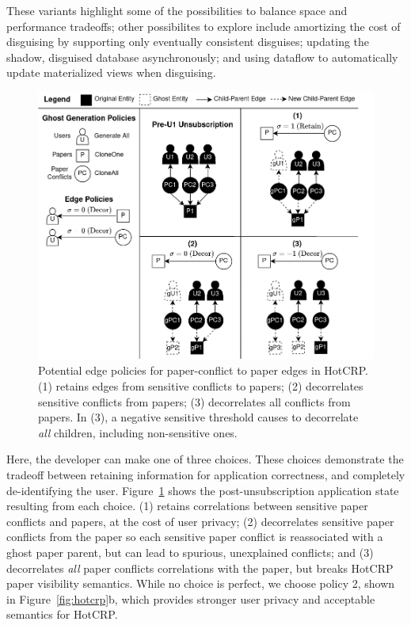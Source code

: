These variants highlight some of the possibilities to balance space and performance tradeoffs; other
possibilites to explore include amortizing the cost of disguising by supporting \eg only eventually
consistent disguises; updating the shadow, disguised database asynchronously; and using dataflow
to automatically update materialized views when disguising.

\iffalse
\begin{figure}[t!]
    \centering
    \includegraphics[width=.5\textwidth]{img/pcs}

    \caption{Potential edge policies for paper-conflict to paper edges in HotCRP.
    (1) retains edges from sensitive conflicts to papers; (2) decorrelates sensitive
    conflicts from papers; (3) decorrelates all conflicts from papers.
    In (3), a negative sensitive threshold causes \sys to
decorrelate \emph{all} children, including non-sensitive ones.}
    \label{fig:pcs}
\end{figure}

Here, the developer can make one of three choices. 
These choices demonstrate the tradeoff between retaining information for application correctness, and completely de-identifying the user.
Figure~\ref{fig:pcs} shows the post-unsubscription application state resulting from each choice.
%
(1) retains correlations between sensitive paper conflicts and papers, at the cost of
user privacy; (2) decorrelates sensitive paper conflicts from the paper so each
sensitive paper conflict is reassociated with a ghost paper parent, but can lead to spurious,
unexplained conflicts; and (3) decorrelates \emph{all} paper conflicts correlations
with the paper, but breaks HotCRP paper visibility semantics.
While no choice is perfect, we choose policy 2, shown in Figure~\ref{fig:hotcrp}b, which provides
stronger user privacy and acceptable semantics for HotCRP.


